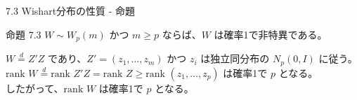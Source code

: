 \documentclass[aspectratio=169]{beamer}
\begin{document}
\begin{frame}{7.3 Wishart分布の性質 - 命題}
\begin{block}{命題 7.3}
$W \sim W_p(m)$ かつ $m \ge p$ ならば、$W$ は確率1で非特異である。
\end{block}

$W \overset{d}{=} Z'Z$ であり、$Z' = (z_1, \dots, z_m)$ かつ $z_i$ は独立同分布の $N_p(0, I)$ に従う。\\
$\text{rank } W \overset{d}{=} \text{rank } Z'Z = \text{rank } Z \ge \text{rank } (z_1, \dots, z_p)$ は確率1で $p$ となる。\\
したがって、$\text{rank } W$ は確率1で $p$ となる。
\end{frame}
\end{document}
